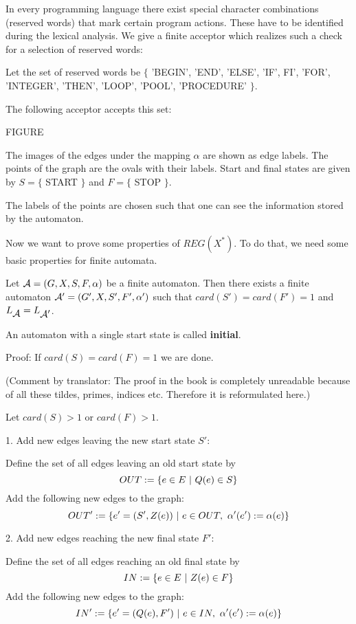In every programming language there exist special character combinations
(reserved words) that mark certain program actions. These have to be identified
during the lexical analysis. We give a finite acceptor which realizes such a check for a selection
of reserved words:

Let the set of reserved words be 
$\{$ 'BEGIN', 'END', 'ELSE', 'IF', FI', 'FOR', 'INTEGER', 'THEN', 'LOOP',
'POOL', 'PROCEDURE' $\}$.

The following acceptor accepts this set:

FIGURE

The images of the edges under the mapping $\alpha$ are shown as edge labels. The
points of the graph are the ovals with their labels. Start and final states are
given by $S = \{$ START $\}$ and $F = \{$ STOP $\}$.

The labels of the points are chosen such that one can see the information stored
by the automaton.

Now we want to prove some properties of $REG(X^*)$. To do that, we need
some basic properties for finite automata.

\begin{lemma}
Let $\mbox{$\mathcal{A}$} = (G, X, S, F, \alpha)$ be a finite automaton. Then there
exists a finite automaton $\mbox{$\mathcal{A'}$} = (G', X, S', F', \alpha')$ such that
$card(S') = card(F') = 1$ and $\mbox{$L_{\mbox{$\mathcal{A}$}}$} = \mbox{$L_{\mbox{$\mathcal{A'}$}}$}$.
\end{lemma}

An automaton with a single start state is called {\bf initial}.

Proof: If $card(S) = card(F) = 1$ we are done.

(Comment by translator: The proof in the book is completely unreadable because
of all these tildes, primes, indices etc. Therefore it is reformulated here.) 

Let $card(S) > 1$ or $card(F) > 1$.

1. Add new edges leaving the new start state $S'$:

Define the set of all edges leaving an old start state by
\[ OUT := \{ e \in E \ |\  Q(e) \in S \} \]
Add the following new edges to the graph:
\[ OUT' := \{ e' = (S', Z(e)) \where e \in OUT,\ \alpha'(e') := \alpha(e) \} \]

2. Add new edges reaching the new final state $F'$:

Define the set of all edges reaching an old final state by
\[ IN := \{ e \in E \ |\  Z(e) \in F \} \]
Add the following new edges to the graph:
\[ IN' := \{ e' = (Q(e), F') \where e \in IN,\ \alpha'(e') := \alpha(e) \} \]

